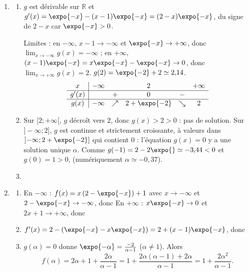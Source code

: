	\begin{enumerate}
		\item \begin{enumerate}
			\item {}
				$g$ est dérivable sur $\mathbb{R}$ et
				$g'(x) = \expo{-x} - (x-1)\expo{-x} = (2-x)\expo{-x}$, du signe de $2-x$ car $\expo{-x}>0$.

				Limites : en $-\infty$, $x - 1 \to -\infty$ et $\expo{-x} \to +\infty$, donc $\lim_{x\to-\infty} g(x) = -\infty$ ;
				en $+\infty$, $(x-1)\expo{-x} = x\expo{-x} - \expo{-x} \to 0$, donc $\lim_{x\to+\infty} g(x) = 2$.
				$g(2) = \expo{-2} + 2 \simeq 2{,}14$.
				\[
				\begin{array}{c|ccccc}
					x & -\infty & & 2 & & +\infty \\ \hline
					g'(x) & & + & 0 & - & \\ \hline
					g(x) & -\infty & \nearrow & 2+\expo{-2} & \searrow & 2
				\end{array}
				\]
			\item {}
				Sur $[2;+\infty[$, $g$ décroît vers $2$, donc $g(x) > 2 > 0$ : pas de solution.
				Sur $]-\infty;2]$, $g$ est continue et strictement croissante, à valeurs dans $\left]-\infty ; 2 + \expo{-2}\right]$
				qui contient $0$ : l'équation $g(x) = 0$ y a une solution unique $\alpha$.
				Comme $g(-1) = 2 - 2\expo{} \simeq -3{,}44 < 0$ et $g(0) = 1 > 0$, 
				(numériquement $\alpha \simeq -0{,}37$).
			\item {}

		\end{enumerate}
		\item \begin{enumerate}
			\item {}
				En $-\infty$ : $f(x) = x\left(2 - \expo{-x}\right) + 1$ avec $x \to -\infty$ et $2 - \expo{-x} \to -\infty$,
				donc 
				En $+\infty$ : $x\expo{-x} \to 0$ et $2x+1 \to +\infty$, donc 
			\item {}
				$f'(x) = 2 - \left(\expo{-x} - x\expo{-x}\right) = 2 + (x-1)\expo{-x}$, donc 
			\item {}
				$g(\alpha) = 0$ donne $\expo{-\alpha} = \frac{-2}{\alpha - 1}$ ($\alpha \neq 1$). Alors
				\[
					f(\alpha) = 2\alpha + 1 + \frac{2\alpha}{\alpha-1} = 1 + \frac{2\alpha(\alpha-1) + 2\alpha}{\alpha - 1}
					= 1 + \frac{2\alpha^2}{\alpha-1}.
				\]


\end{enumerate}
\end{enumerate}
